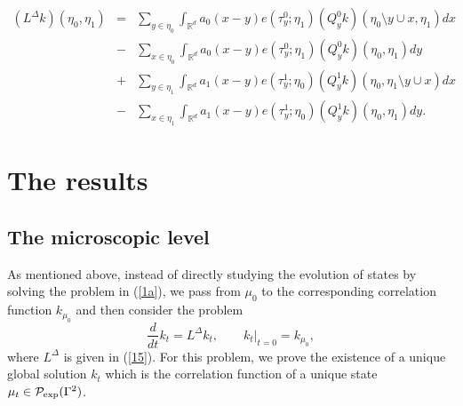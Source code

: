 \documentclass[reqno,11pt]{amsart}
\theoremstyle{definition}
\theoremstyle{remark}
\numberwithin{equation}{section}
\begin{document}
\begin{eqnarray}
  \label{15}
(L^\Delta k) (\eta_0, \eta_1) & = & \sum_{y\in \eta_0}
\int_{\mathds{R}^d} a_0 (x-y) e(\tau^0_y;\eta_1) (Q_y^0 k)
(\eta_0\setminus y \cup x,
\eta_1) d x \nonumber \\[.2cm]
& - & \sum_{x\in \eta_0} \int_{\mathds{R}^d} a_0 (x-y)
e(\tau^0_y;\eta_1) (Q_y^0 k) (\eta_0,
\eta_1) d y  \\[.2cm]
& + & \sum_{y\in \eta_1} \int_{\mathds{R}^d} a_1 (x-y)
e(\tau^1_y;\eta_0) (Q_y^1 k) (\eta_0,
\eta_1\setminus y \cup x) d x \nonumber \\[.2cm] & - & \sum_{x\in \eta_1} \int_{\mathds{R}^d} a_1 (x-y)
e(\tau^1_y;\eta_0) (Q_y^1 k) (\eta_0, \eta_1) d y. \nonumber
\end{eqnarray}

\section{The results}

 \label{S3}

\subsection{The microscopic level}

As mentioned above, instead of directly studying the evolution of
states by solving the problem in (\ref{1a}), we pass from $\mu_0$ to
the corresponding correlation function $k_{\mu_0}$ and then consider
the problem
\begin{equation}
  \label{16}
\frac{d}{dt} k_t = L^\Delta k_t, \qquad k_t|_{t=0} = k_{\mu_0},
\end{equation}
where $L^\Delta$ is given in (\ref{15}). For this problem, we prove
the existence of a unique global solution $k_t$ which is the
correlation function of a unique state $\mu_t \in \mathcal{P}_{\rm
exp}(\Gamma^2)$.
\end{document}
